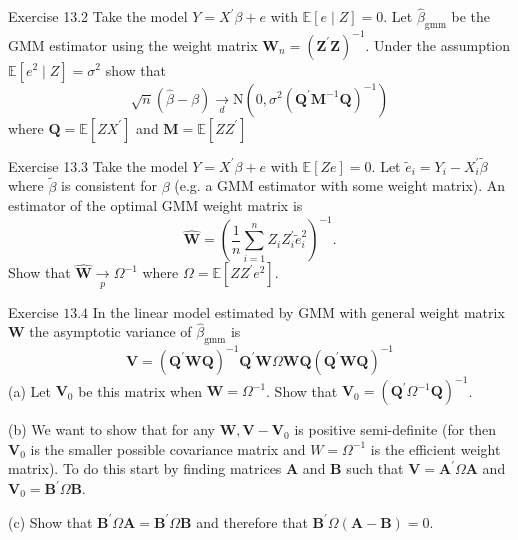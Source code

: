 \documentclass[10pt]{article}
\begin{document}
Exercise 13.2 Take the model $Y=X^{\prime} \beta+e$ with $\mathbb{E}[e \mid Z]=0$. Let $\widehat{\beta}_{\mathrm{gmm}}$ be the GMM estimator using the weight matrix $\boldsymbol{W}_{n}=\left(\boldsymbol{Z}^{\prime} \boldsymbol{Z}\right)^{-1}$. Under the assumption $\mathbb{E}\left[e^{2} \mid Z\right]=\sigma^{2}$ show that
$$
\sqrt{n}(\widehat{\beta}-\beta) \underset{d}{\longrightarrow} \mathrm{N}\left(0, \sigma^{2}\left(\boldsymbol{Q}^{\prime} \boldsymbol{M}^{-1} \boldsymbol{Q}\right)^{-1}\right)
$$
where $\boldsymbol{Q}=\mathbb{E}\left[Z X^{\prime}\right]$ and $\boldsymbol{M}=\mathbb{E}\left[Z Z^{\prime}\right]$

Exercise 13.3 Take the model $Y=X^{\prime} \beta+e$ with $\mathbb{E}[Z e]=0$. Let $\widetilde{e}_{i}=Y_{i}-X_{i}^{\prime} \widetilde{\beta}$ where $\widetilde{\beta}$ is consistent for $\beta$ (e.g. a GMM estimator with some weight matrix). An estimator of the optimal GMM weight matrix is
$$
\widehat{\boldsymbol{W}}=\left(\frac{1}{n} \sum_{i=1}^{n} Z_{i} Z_{i}^{\prime} \widetilde{e}_{i}^{2}\right)^{-1} .
$$
Show that $\widehat{\boldsymbol{W}} \underset{p}{\longrightarrow} \Omega^{-1}$ where $\Omega=\mathbb{E}\left[Z Z^{\prime} e^{2}\right]$.

Exercise $13.4$ In the linear model estimated by GMM with general weight matrix $\boldsymbol{W}$ the asymptotic variance of $\widehat{\beta}_{\mathrm{gmm}}$ is
$$
\boldsymbol{V}=\left(\boldsymbol{Q}^{\prime} \boldsymbol{W} \boldsymbol{Q}\right)^{-1} \boldsymbol{Q}^{\prime} \boldsymbol{W} \Omega \boldsymbol{W} \boldsymbol{Q}\left(\boldsymbol{Q}^{\prime} \boldsymbol{W} \boldsymbol{Q}\right)^{-1}
$$
(a) Let $\boldsymbol{V}_{0}$ be this matrix when $\boldsymbol{W}=\Omega^{-1}$. Show that $\boldsymbol{V}_{0}=\left(\boldsymbol{Q}^{\prime} \Omega^{-1} \boldsymbol{Q}\right)^{-1}$.

(b) We want to show that for any $\boldsymbol{W}, \boldsymbol{V}-\boldsymbol{V}_{0}$ is positive semi-definite (for then $\boldsymbol{V}_{0}$ is the smaller possible covariance matrix and $W=\Omega^{-1}$ is the efficient weight matrix). To do this start by finding matrices $\boldsymbol{A}$ and $\boldsymbol{B}$ such that $\boldsymbol{V}=\boldsymbol{A}^{\prime} \Omega \boldsymbol{A}$ and $\boldsymbol{V}_{0}=\boldsymbol{B}^{\prime} \Omega \boldsymbol{B}$.

(c) Show that $\boldsymbol{B}^{\prime} \Omega \boldsymbol{A}=\boldsymbol{B}^{\prime} \Omega \boldsymbol{B}$ and therefore that $\boldsymbol{B}^{\prime} \Omega(\boldsymbol{A}-\boldsymbol{B})=0$.
\end{document}
